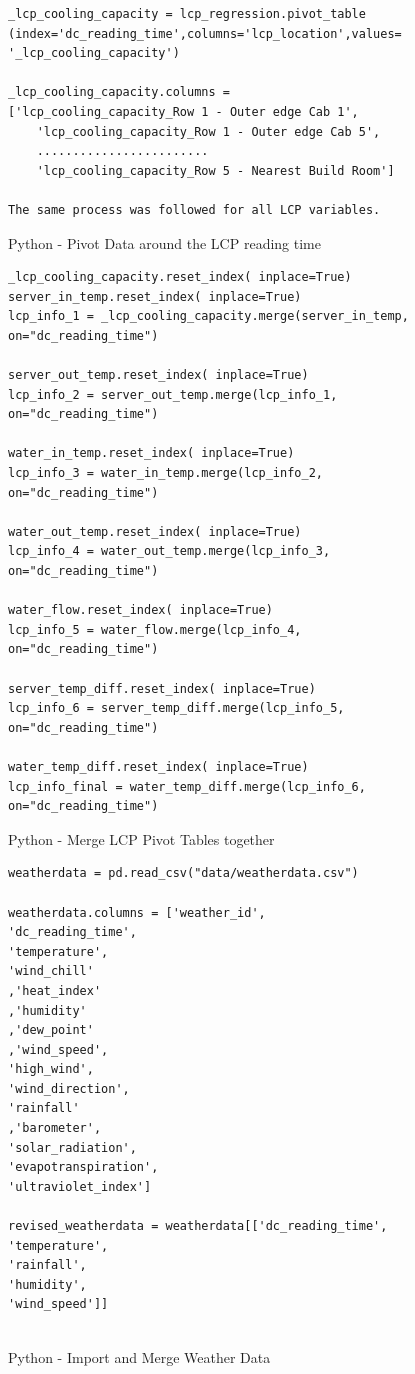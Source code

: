 \documentclass[12pt]{scrartcl}
\begin{document}
\begin{listing}[H]
\begin{verbatim}
_lcp_cooling_capacity = lcp_regression.pivot_table
(index='dc_reading_time',columns='lcp_location',values=
'_lcp_cooling_capacity')

_lcp_cooling_capacity.columns = 
['lcp_cooling_capacity_Row 1 - Outer edge Cab 1',
    'lcp_cooling_capacity_Row 1 - Outer edge Cab 5', 
    ........................
    'lcp_cooling_capacity_Row 5 - Nearest Build Room']
    
The same process was followed for all LCP variables.

\end{verbatim}
\caption{Python - Pivot Data around the LCP reading time}
\label{list:[Python - Pivot Data around the LCP reading time]}
\end{listing}

\begin{listing}[H]
\begin{verbatim}
_lcp_cooling_capacity.reset_index( inplace=True)
server_in_temp.reset_index( inplace=True)
lcp_info_1 = _lcp_cooling_capacity.merge(server_in_temp, 
on="dc_reading_time")

server_out_temp.reset_index( inplace=True)
lcp_info_2 = server_out_temp.merge(lcp_info_1, 
on="dc_reading_time")

water_in_temp.reset_index( inplace=True)
lcp_info_3 = water_in_temp.merge(lcp_info_2, 
on="dc_reading_time")

water_out_temp.reset_index( inplace=True)
lcp_info_4 = water_out_temp.merge(lcp_info_3, 
on="dc_reading_time")

water_flow.reset_index( inplace=True)
lcp_info_5 = water_flow.merge(lcp_info_4, 
on="dc_reading_time")

server_temp_diff.reset_index( inplace=True)
lcp_info_6 = server_temp_diff.merge(lcp_info_5, 
on="dc_reading_time")

water_temp_diff.reset_index( inplace=True)
lcp_info_final = water_temp_diff.merge(lcp_info_6, 
on="dc_reading_time")

\end{verbatim}
\caption{Python - Merge LCP Pivot Tables together}
\label{list:[Python - Merge LCP Pivot Tables together]}
\end{listing}

\begin{listing}[H]
\begin{verbatim}
weatherdata = pd.read_csv("data/weatherdata.csv")

weatherdata.columns = ['weather_id',
'dc_reading_time',
'temperature',
'wind_chill'
,'heat_index'
,'humidity'
,'dew_point'
,'wind_speed',
'high_wind',
'wind_direction',
'rainfall'
,'barometer',
'solar_radiation',
'evapotranspiration',
'ultraviolet_index']

revised_weatherdata = weatherdata[['dc_reading_time',
'temperature',
'rainfall',
'humidity',
'wind_speed']]


\end{verbatim}
\caption{Python - Import and Merge Weather Data}
\label{list:[Python - Import and Merge Weather Data]}
\end{listing}
\end{document}
